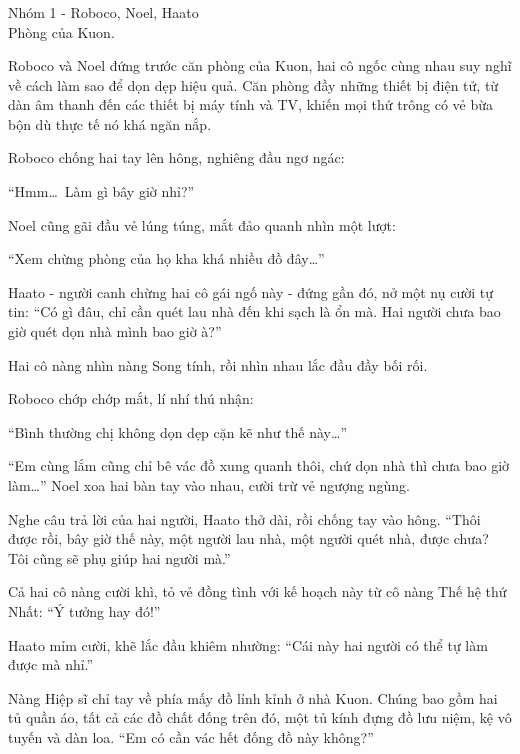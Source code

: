 \documentclass[../main.tex]{subfiles}
\begin{document}
\vspace{-40pt} \subsubsection*{\label{ep-003.IVa}} 

\begin{center}
    {\color{T1} Nhóm 1 - Roboco, Noel, Haato}\\Phòng của Kuon.
\end{center}

Roboco và Noel đứng trước căn phòng của Kuon, hai cô ngốc cùng nhau suy nghĩ về cách làm sao để dọn dẹp hiệu quả. Căn phòng đầy những thiết bị điện tử, từ dàn âm thanh đến các thiết bị máy tính và TV, khiến mọi thứ trông có vẻ bừa bộn dù thực tế nó khá ngăn nắp.

Roboco chống hai tay lên hông, nghiêng đầu ngơ ngác:

``Hmm\dots\ Làm gì bây giờ nhỉ?''

Noel cũng gãi đầu vẻ lúng túng, mắt đảo quanh nhìn một lượt:

``Xem chừng phòng của họ kha khá nhiều đồ đây\dots''

Haato - người canh chừng hai cô gái ngố này - đứng gần đó, nở một nụ cười tự tin: ``Có gì đâu, chỉ cần quét lau nhà đến khi sạch là ổn mà. Hai người chưa bao giờ quét dọn nhà mình bao giờ à?''

Hai cô nàng nhìn nàng Song tính, rồi nhìn nhau lắc đầu đầy bối rối.

Roboco chớp chớp mắt, lí nhí thú nhận:

``Bình thường chị không dọn dẹp cặn kẽ như thế này\dots''

``Em cùng lắm cũng chỉ bê vác đồ xung quanh thôi, chứ dọn nhà thì chưa bao giờ làm\dots'' Noel xoa hai bàn tay vào nhau, cười trừ vẻ ngượng ngùng.

Nghe câu trả lời của hai người, Haato thở dài, rồi chống tay vào hông. ``Thôi được rồi, bây giờ thế này, một người lau nhà, một người quét nhà, được chưa? Tôi cũng sẽ phụ giúp hai người mà.''

Cả hai cô nàng cười khì, tỏ vẻ đồng tình với kế hoạch này từ cô nàng Thế hệ thứ Nhất: ``Ý tưởng hay đó!''

Haato mỉm cười, khẽ lắc đầu khiêm nhường: ``Cái này hai người có thể tự làm được mà nhỉ.''

Nàng Hiệp sĩ chỉ tay về phía mấy đồ lỉnh kỉnh ở nhà Kuon. Chúng bao gồm hai tủ quần áo, tất cả các đồ chất đống trên đó, một tủ kính đựng đồ lưu niệm, kệ vô tuyến và dàn loa. ``Em có cần vác hết đống đồ này không?''
\end{document}
